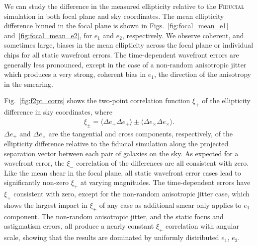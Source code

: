 \documentclass[usenatbib]{mnras}
\begin{document}
We can study the difference in the measured ellipticity relative to the \textsc{Fiducial} simulation in both focal plane and sky coordinates. 
The mean ellipticity difference binned in the focal plane is shown in Figs.~\ref{fig:focal_mean_e1}  and~\ref{fig:focal_mean_e2}, for $e_1$ and $e_2$, respectively. 
We observe coherent, and sometimes large, biases in the mean ellipticity across the focal plane or individual chips for all static wavefront errors. 
The time-dependent wavefront errors are generally less pronounced, except in the case of a non-random anisotropic jitter which produces a very strong, coherent bias in $e_1$, the direction of the anisotropy in the smearing.

Fig.~\ref{fig:f2pt_corrs} shows the two-point correlation function $\xi_{+}$ of the ellipticity difference in sky coordinates, where
\begin{align}
\xi_{\pm} = \langle \Delta e_{+}\Delta e_{+} \rangle \pm \langle \Delta e_{\times}\Delta e_{\times} \rangle.
\end{align}
$\Delta e_{+}$ and $\Delta e_{\times}$ are the tangential and cross components, respectively, of the ellipticity difference relative to the fiducial simulation along the projected separation vector between each pair of galaxies on the sky. 
As expected for a wavefront error, the $\xi_{-}$ correlation of the differences are all consistent with zero. Like the mean shear in the focal plane, all static wavefront error cases lead to significantly non-zero $\xi_{+}$ at varying magnitudes. 
The time-dependent errors have $\xi_{+}$ consistent with zero, except for the non-random anisotropic jitter case, which shows the largest impact in $\xi_{+}$ of any case as additional smear only applies to $e_1$ component. 
The non-random anisotropic jitter, and the static focus and astigmatism errors, all produce a nearly constant $\xi_{+}$ correlation with angular scale, showing that the results are dominated by uniformly distributed $e_1$, $e_2$.
\end{document}
